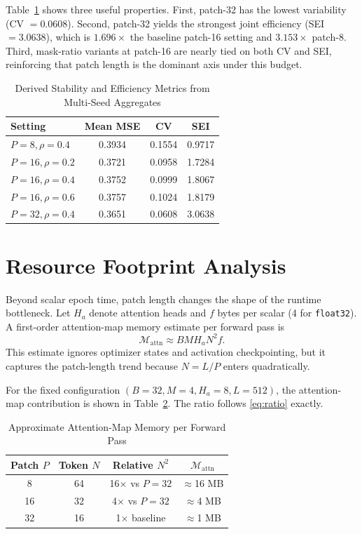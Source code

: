 \documentclass[conference]{IEEEtran}
\begin{document}
Table~\ref{tab:frontier_metrics} shows three useful properties. First, patch-32 has the lowest variability (CV $=0.0608$). Second, patch-32 yields the strongest joint efficiency (SEI $=3.0638$), which is $1.696\times$ the baseline patch-16 setting and $3.153\times$ patch-8. Third, mask-ratio variants at patch-16 are nearly tied on both CV and SEI, reinforcing that patch length is the dominant axis under this budget.

\begin{table}[t]
\caption{Derived Stability and Efficiency Metrics from Multi-Seed Aggregates}
\label{tab:frontier_metrics}
\centering
\begin{tabular}{lccc}
\toprule
Setting & Mean MSE & CV & SEI \\
\midrule
$P=8,\rho=0.4$  & 0.3934 & 0.1554 & 0.9717 \\
$P=16,\rho=0.2$ & 0.3721 & 0.0958 & 1.7284 \\
$P=16,\rho=0.4$ & 0.3752 & 0.0999 & 1.8067 \\
$P=16,\rho=0.6$ & 0.3757 & 0.1024 & 1.8179 \\
$P=32,\rho=0.4$ & 0.3651 & 0.0608 & 3.0638 \\
\bottomrule
\end{tabular}
\end{table}

\section{Resource Footprint Analysis}
Beyond scalar epoch time, patch length changes the shape of the runtime bottleneck. Let $H_a$ denote attention heads and $f$ bytes per scalar (4 for \texttt{float32}). A first-order attention-map memory estimate per forward pass is
\begin{equation}
\mathcal{M}_{\text{attn}} \approx B M H_a N^2 f.
\label{eq:attn_mem}
\end{equation}
This estimate ignores optimizer states and activation checkpointing, but it captures the patch-length trend because $N=L/P$ enters quadratically.

For the fixed configuration $(B=32, M=4, H_a=8, L=512)$, the attention-map contribution is shown in Table~\ref{tab:attn_mem}. The ratio follows \eqref{eq:ratio} exactly.

\begin{table}[t]
\caption{Approximate Attention-Map Memory per Forward Pass}
\label{tab:attn_mem}
\centering
\begin{tabular}{cccc}
\toprule
Patch $P$ & Token $N$ & Relative $N^2$ & $\mathcal{M}_{\text{attn}}$ \\
\midrule
8  & 64 & 16$\times$ vs $P=32$ & $\approx$16 MB \\
16 & 32 & 4$\times$ vs $P=32$ & $\approx$4 MB \\
32 & 16 & 1$\times$ baseline & $\approx$1 MB \\
\bottomrule
\end{tabular}
\end{table}
\end{document}
